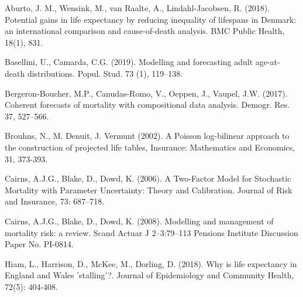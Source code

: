 \documentclass[a4,11pt]{article}
\begin{document}
\begin{thebibliography}{99}

Aburto, J. M., Wensink, M., van Raalte, A., Lindahl-Jacobsen, R. (2018). Potential gains in life expectancy by reducing inequality of lifespans in Denmark: an international comparison and cause-of-death analysis. BMC Public Health, 18(1), 831.


Basellini, U., Camarda, C.G. (2019). Modelling and forecasting adult age-at-death distributions. Popul. Stud. 73 (1), 119–138.

Bergeron-Boucher, M.P., Canudas-Romo, V., Oeppen, J., Vaupel, J.W. (2017). Coherent forecasts of mortality with compositional data analysis. Demogr. Res. 37, 527–566. 


Brouhns, N., M. Denuit, J. Vermunt (2002). A Poisson log-bilinear approach to the construction of projected life tables, Insurance: Mathematics and Economics, 31, 373-393.

Cairns, A.J.G., Blake, D., Dowd, K. (2006). A Two-Factor Model for Stochastic Mortality with Parameter Uncertainty: Theory and Calibration. Journal of Risk and Insurance, 73: 687--718.

Cairns, A.J.G., Blake, D., Dowd, K. (2008). Modelling and management of mortality risk: a review. Scand Actuar J 2–3:79–113 Pensions Institute Discussion Paper No. PI-0814.


Hiam, L., Harrison, D., McKee, M., Dorling, D. (2018). Why is life expectancy in England and Wales 'stalling'?. Journal of Epidemiology and Community Health, 72(5): 404-408.


\end{thebibliography}
\end{document}

